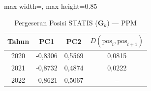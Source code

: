 \begin{table}[H]
\centering
\caption{Pergeseran Posisi STATIS ($\mathbf{G}_k$) --- PPM} \label{tab:sample1jarak_statis_loading_ppm}
\begin{adjustbox}{max width=\textwidth, max height=0.85\textheight}
\begin{tabular}{|c|c|c|c|}
\hline
\textbf{Tahun} & \textbf{PC1} & \textbf{PC2} & \textbf{$D(\text{pos}_t, \text{pos}_{t+1})$} \\
\hline
2020 & -0,8306 & 0,5569 & 0,0815 \\
2021 & -0,8732 & 0,4874 & 0,0222 \\
2022 & -0,8621 & 0,5067 & -- \\
\hline
\end{tabular}
\end{adjustbox}
\end{table}